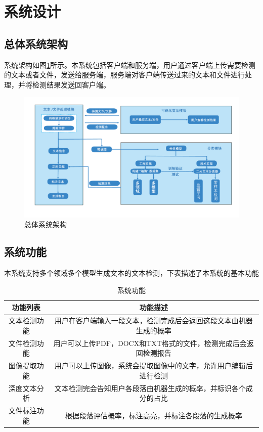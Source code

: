 \documentclass[a4paper]{report}
\begin{document}
\section{系统设计}
\subsection{总体系统架构}
系统架构如图\ref{总体系统架构}所示。本系统包括客户端和服务端，用户通过客户端上传需要检测的文本或者文件，发送给服务端，服务端对客户端传送过来的文本和文件进行处理，并将检测结果发送回客户端。
\begin{figure}[H]
	\centering
	\includegraphics[width=1\textwidth]{figures/系统架构图.pdf}
	\caption{总体系统架构}
	\label{总体系统架构}
\end{figure}

\subsection{系统功能}
本系统支持多个领域多个模型生成文本的文本检测，下表描述了本系统的基本功能
\begin{table}[H]
	\centering
	\begin{tabular}{cc}
		\toprule
		\textbf{功能列表} & \textbf{功能描述}                        \\ \midrule
		文本检测功能        & 用户在客户端输入一段文本，检测完成后会返回这段文本由机器生成的概率    \\ \midrule
		文件检测功能        & 用户可以上传PDF，DOCX和TXT格式的文件，检测完成后会返回检测报告 \\ \midrule
		图像提取功能        & 用户可以上传图像，系统会提取图像中的文字，允许用户编辑后进行检测     \\      \midrule
		深度文本分析        & 文本检测完会告知用户各段落由机器生成的概率，并标识各个成分的占比     \\ \midrule
		文件标注功能        & 根据段落评估概率，标注高亮，并标注各段落的生成概率            \\
		\midrule
	\end{tabular}
	\caption{系统功能}
	\label{系统功能}
\end{table}
\end{document}

